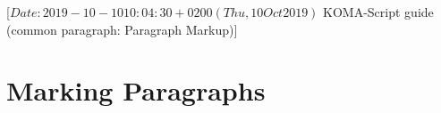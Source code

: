 %
%
%
%
%
%
%
%
% 
%
%
%
%

                 [$Date: 2019-10-10 10:04:30 +0200 (Thu, 10 Oct 2019) $
                  KOMA-Script guide (common paragraph: Paragraph Markup)]


\section{Marking Paragraphs}
%
\BeginIndexGroup
{}%


